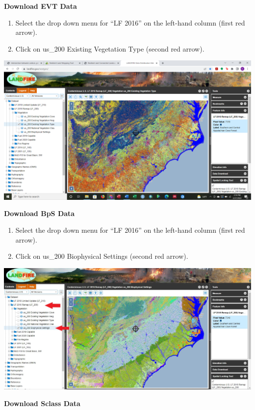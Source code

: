 \documentclass[
]{book}
\providecommand{\tightlist}{%
  \setlength{\itemsep}{0pt}\setlength{\parskip}{0pt}}
\begin{document}
\textbf{Download EVT Data}

\begin{enumerate}
\def\labelenumi{\arabic{enumi}.}
\tightlist
\item
  Select the drop down menu for ``LF 2016'' on the left-hand column (first red arrow).
\item
  Click on us\_200 Existing Vegetation Type (second red arrow).
\end{enumerate}

\includegraphics[width=1000px]{KP_screenshots/LANDFIRE Find EVT}

\textbf{Download BpS Data}

\begin{enumerate}
\def\labelenumi{\arabic{enumi}.}
\tightlist
\item
  Select the drop down menu for ``LF 2016'' on the left-hand column (first red arrow).
\item
  Click on us\_200 Biophysical Settings (second red arrow).
\end{enumerate}

\includegraphics[width=1000px]{KP_screenshots/LANDFIRE Find BpS}

\textbf{Download Sclass Data}
\end{document}
